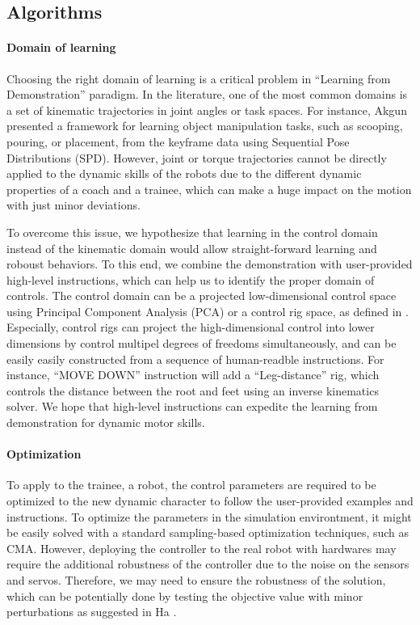 \subsection{Algorithms}

\paragraph{Domain of learning}

Choosing the right domain of learning is a critical problem 
in ``Learning from Demonstration'' paradigm.
In the literature, one of the most common domains is a set of kinematic
trajectories in joint angles or task spaces.
For instance, Akgun \etal \cite{Akgun:2011:KLD} presented a framework
for learning object manipulation tasks, such as scooping, pouring, or 
placement, from the keyframe data using Sequential Pose Distributions (SPD).
However, joint or torque trajectories cannot be directly applied to the
dynamic skills of the robots  due to the different dynamic properties 
of a coach and a trainee, which can make a huge impact on the motion
with just minor deviations.

To overcome this issue, we hypothesize that learning in the control domain
instead of the kinematic domain would allow straight-forward learning and
roboust behaviors.
To this end, we combine the demonstration with user-provided high-level
instructions, which can help us to identify the proper domain of controls.
The control domain can be a projected low-dimensional control space using
Principal Component Analysis (PCA) or a control rig space, as defined
in \cite{Ha:2014:ITD}.
Especially, control rigs can project the high-dimensional control into
lower dimensions by control multipel degrees of freedoms simultaneously,
and can be easily  easily constructed from a sequence of human-readble 
instructions.
For instance, ``MOVE DOWN'' instruction will add a ``Leg-distance'' rig,
which controls the distance between the root and feet using an inverse
kinematics solver.
We hope that high-level instructions can expedite the learning from
demonstration for dynamic motor skills.

\paragraph{Optimization}

To apply to the trainee, a robot, the control parameters are required to be
optimized to the new dynamic character to follow the user-provided 
examples and instructions.
To optimize the parameters in the simulation environtment, 
it might be easily solved with a standard sampling-based optimization
techniques, such as CMA.
However, deploying the controller to the real robot with hardwares
may require the additional robustness of the controller
due to the noise on the sensors and servos.
Therefore, we may need to ensure the robustness of the solution,
which can be potentially done by  testing the objective value 
with minor perturbations as suggested in Ha \etal \cite{Ha:2013:PSB}.

